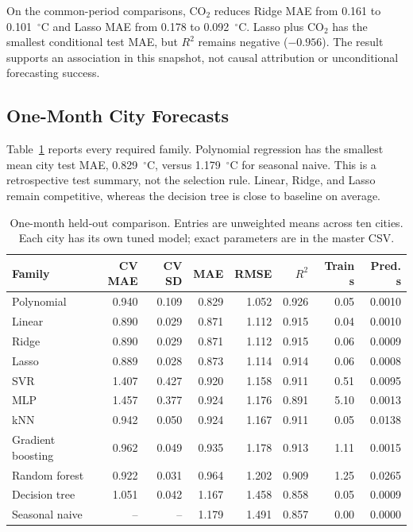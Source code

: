 \documentclass[conference]{IEEEtran}
\begin{document}
On the common-period comparisons, CO$_2$ reduces Ridge MAE from 0.161 to 0.101~$^\circ$C and Lasso MAE from 0.178 to 0.092~$^\circ$C. Lasso plus CO$_2$ has the smallest conditional test MAE, but $R^2$ remains negative ($-0.956$). The result supports an association in this snapshot, not causal attribution or unconditional forecasting success.

\subsection{One-Month City Forecasts}
Table~\ref{tab:regression} reports every required family. Polynomial regression has the smallest mean city test MAE, 0.829~$^\circ$C, versus 1.179~$^\circ$C for seasonal naive. This is a retrospective test summary, not the selection rule. Linear, Ridge, and Lasso remain competitive, whereas the decision tree is close to baseline on average.
\begin{table}[!tbp]
\caption{One-month held-out comparison. Entries are unweighted means across ten cities. Each city has its own tuned model; exact parameters are in the master CSV.}\label{tab:regression}\centering\scriptsize
\begin{tabular}{lrrrrrrr}
\toprule Family & CV MAE & CV SD & MAE & RMSE & $R^2$ & Train s & Pred. s \\\midrule
Polynomial & 0.940 & 0.109 & 0.829 & 1.052 & 0.926 & 0.05 & 0.0010 \\
Linear & 0.890 & 0.029 & 0.871 & 1.112 & 0.915 & 0.04 & 0.0010 \\
Ridge & 0.890 & 0.029 & 0.871 & 1.112 & 0.915 & 0.06 & 0.0009 \\
Lasso & 0.889 & 0.028 & 0.873 & 1.114 & 0.914 & 0.06 & 0.0008 \\
SVR & 1.407 & 0.427 & 0.920 & 1.158 & 0.911 & 0.51 & 0.0095 \\
MLP & 1.457 & 0.377 & 0.924 & 1.176 & 0.891 & 5.10 & 0.0013 \\
kNN & 0.942 & 0.050 & 0.924 & 1.167 & 0.911 & 0.05 & 0.0138 \\
Gradient boosting & 0.962 & 0.049 & 0.935 & 1.178 & 0.913 & 1.11 & 0.0015 \\
Random forest & 0.922 & 0.031 & 0.964 & 1.202 & 0.909 & 1.25 & 0.0265 \\
Decision tree & 1.051 & 0.042 & 1.167 & 1.458 & 0.858 & 0.05 & 0.0009 \\
Seasonal naive & -- & -- & 1.179 & 1.491 & 0.857 & 0.00 & 0.0000 \\
\bottomrule
\end{tabular}\end{table}
\end{document}
